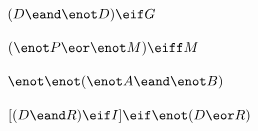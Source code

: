 \begin{earg}

\item	$(D \eand \enot D) \eif G $




\item	$(\enot P \eor \enot M) \eiff M $




\item	$\enot \enot (\enot A \eand \enot B)  $




\item 	$[(D \eand R) \eif I] \eif \enot(D \eor R) $


\end{earg}
